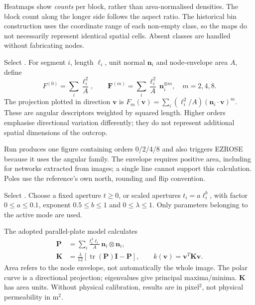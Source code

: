 Heatmaps show \emph{counts} per block, rather than area-normalised densities. The block count along the longer side follows the aspect ratio. The historical bin construction uses the coordinate range of each non-empty class, so the maps do not necessarily represent identical spatial cells. Absent classes are handled without fabricating nodes.

Select . For segment \(i\), length \(\ell_i\), unit normal \(\mathbf n_i\) and node-envelope area \(A\), define
\begin{equation}
F^{(0)}=\sum_i\frac{\ell_i^2}{A},\qquad
\mathbf F^{(m)}=\sum_i\frac{\ell_i^2}{A}\,\mathbf n_i^{\otimes m},
\quad m=2,4,8.
\end{equation}
The projection plotted in direction \(\mathbf v\) is
\(F_m(\mathbf v)=\sum_i(\ell_i^2/A)(\mathbf n_i\cdot\mathbf v)^m\).
These are angular descriptors weighted by squared length. Higher orders emphasise directional variation differently; they do not represent additional spatial dimensions of the outcrop.

Run produces one figure containing orders 0/2/4/8 and also triggers EZROSE because it uses the angular family. The envelope requires positive area, including for networks extracted from images; a single line cannot support this calculation. Poles use the reference's own north, rounding and flip convention.

Select . Choose a fixed aperture \(t\geq0\), or scaled apertures \(t_i=a\ell_i^b\), with factor \(0\leq a\leq0.1\), exponent \(0.5\leq b\leq1\) and \(0\leq\lambda\leq1\). Only parameters belonging to the active mode are used.

The adopted parallel-plate model calculates
\begin{align}
\mathbf P&=\sum_i\frac{t_i^3\ell_i}{A}\,\mathbf n_i\otimes\mathbf n_i,\\
\mathbf K&=\frac{\lambda}{12}\left[\operatorname{tr}(\mathbf P)\mathbf I-\mathbf P\right],\qquad
k(\mathbf v)=\mathbf v^{\!T}\mathbf K\mathbf v.
\end{align}
Area refers to the node envelope, not automatically the whole image. The polar curve is a directional projection; eigenvalues give principal maxima/minima. \(\mathbf K\) has area units. Without physical calibration, results are in pixel\(^{2}\), not physical permeability in m\(^{2}\).

